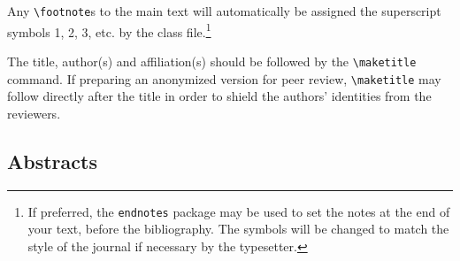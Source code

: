 \documentclass{gCMB2e}
\begin{document}
Any \verb"\footnote"s to the main text will automatically be assigned the superscript
 symbols 1, 2, 3, etc. by the class file.\footnote{If preferred, the \texttt{endnotes} package
 may be used to set the notes at the end of your text, before the bibliography.
 The symbols will be changed to match the style of the journal if necessary by the typesetter.}

The title, author(s) and affiliation(s) should be followed by the {\verb"\maketitle"} command. If preparing an anonymized version for peer review, {\verb"\maketitle"} may follow directly after the title in order to shield the authors' identities from the reviewers.


\subsection{Abstracts}
\end{document}
